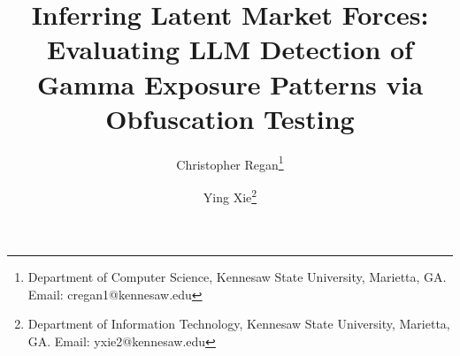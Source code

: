 \documentclass[12pt,letterpaper]{article}
\begin{document}
\title{Inferring Latent Market Forces: Evaluating LLM Detection of Gamma Exposure Patterns via Obfuscation Testing}

\author{
Christopher Regan\thanks{Department of Computer Science, Kennesaw State University, Marietta, GA. Email: cregan1@kennesaw.edu}
\and
Ying Xie\thanks{Department of Information Technology, Kennesaw State University, Marietta, GA. Email: yxie2@kennesaw.edu}
}

\date{} %

\maketitle


%
%
\end{document}
